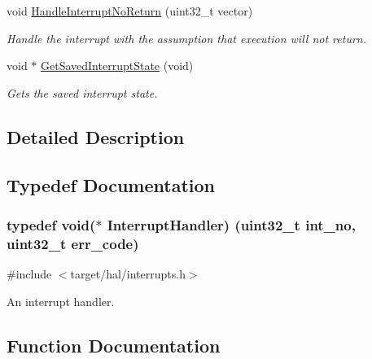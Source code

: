 \begin{DoxyCompactItemize}
void \hyperlink{group__interrupt__man_gad9fcef5bc8393fd3633dceb1e85d4de4}{Handle\+Interrupt\+No\+Return} (uint32\+\_\+t vector)
\begin{DoxyCompactList}\small\item\em Handle the interrupt with the assumption that execution will not return. \end{DoxyCompactList}\item 
void $\ast$ \hyperlink{group__interrupt__man_gafeb835b77571ca2827766fd3747d5b08}{Get\+Saved\+Interrupt\+State} (void)
\begin{DoxyCompactList}\small\item\em Gets the saved interrupt state. \end{DoxyCompactList}\end{DoxyCompactItemize}


\subsection{Detailed Description}


\subsection{Typedef Documentation}
\subsubsection[{\texorpdfstring{Interrupt\+Handler}{InterruptHandler}}]{\setlength{\rightskip}{0pt plus 5cm}typedef void($\ast$ Interrupt\+Handler) (uint32\+\_\+t int\+\_\+no, uint32\+\_\+t err\+\_\+code)}\hypertarget{group__interrupt__man_ga018c3952c089b6c66a8c04d5626b5d56}{}\label{group__interrupt__man_ga018c3952c089b6c66a8c04d5626b5d56}


{\ttfamily \#include $<$target/hal/interrupts.\+h$>$}

An interrupt handler. 

\subsection{Function Documentation}
